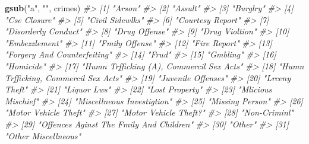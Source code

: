 \documentclass[
  12pt,
]{book}
\newenvironment{Shaded}{\begin{snugshade}}{\end{snugshade}}
\newcommand{\CommentTok}[1]{\textcolor[rgb]{0.37,0.37,0.37}{\textit{#1}}}
\newcommand{\KeywordTok}[1]{\textcolor[rgb]{0.27,0.27,0.27}{\textbf{#1}}}
\newcommand{\NormalTok}[1]{#1}
\newcommand{\StringTok}[1]{\textcolor[rgb]{0.5,0.5,0.5}{#1}}
\begin{document}
\begin{Shaded}
\begin{Highlighting}[]
\KeywordTok{gsub}\NormalTok{(}\StringTok{"a"}\NormalTok{, }\StringTok{""}\NormalTok{, crimes)}
\CommentTok{\#\textgreater{}  [1] "Arson"                                  }
\CommentTok{\#\textgreater{}  [2] "Assult"                                 }
\CommentTok{\#\textgreater{}  [3] "Burglry"                                }
\CommentTok{\#\textgreater{}  [4] "Cse Closure"                            }
\CommentTok{\#\textgreater{}  [5] "Civil Sidewlks"                         }
\CommentTok{\#\textgreater{}  [6] "Courtesy Report"                        }
\CommentTok{\#\textgreater{}  [7] "Disorderly Conduct"                     }
\CommentTok{\#\textgreater{}  [8] "Drug Offense"                           }
\CommentTok{\#\textgreater{}  [9] "Drug Violtion"                          }
\CommentTok{\#\textgreater{} [10] "Embezzlement"                           }
\CommentTok{\#\textgreater{} [11] "Fmily Offense"                          }
\CommentTok{\#\textgreater{} [12] "Fire Report"                            }
\CommentTok{\#\textgreater{} [13] "Forgery And Counterfeiting"             }
\CommentTok{\#\textgreater{} [14] "Frud"                                   }
\CommentTok{\#\textgreater{} [15] "Gmbling"                                }
\CommentTok{\#\textgreater{} [16] "Homicide"                               }
\CommentTok{\#\textgreater{} [17] "Humn Trfficking (A), Commercil Sex Acts"}
\CommentTok{\#\textgreater{} [18] "Humn Trfficking, Commercil Sex Acts"    }
\CommentTok{\#\textgreater{} [19] "Juvenile Offenses"                      }
\CommentTok{\#\textgreater{} [20] "Lrceny Theft"                           }
\CommentTok{\#\textgreater{} [21] "Liquor Lws"                             }
\CommentTok{\#\textgreater{} [22] "Lost Property"                          }
\CommentTok{\#\textgreater{} [23] "Mlicious Mischief"                      }
\CommentTok{\#\textgreater{} [24] "Miscellneous Investigtion"              }
\CommentTok{\#\textgreater{} [25] "Missing Person"                         }
\CommentTok{\#\textgreater{} [26] "Motor Vehicle Theft"                    }
\CommentTok{\#\textgreater{} [27] "Motor Vehicle Theft?"                   }
\CommentTok{\#\textgreater{} [28] "Non{-}Criminl"                            }
\CommentTok{\#\textgreater{} [29] "Offences Aginst The Fmily And Children" }
\CommentTok{\#\textgreater{} [30] "Other"                                  }
\CommentTok{\#\textgreater{} [31] "Other Miscellneous"                     }

\end{Highlighting}
\end{Shaded}
\end{document}
